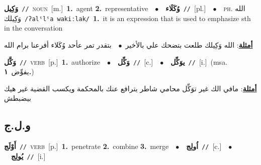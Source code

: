 \documentclass[10pt,a4paper,twoside]{article} %
\begin{document}
\begin{multicols}{2}
{\setlength\topsep{0pt}\textbf{\foreignlanguage{arabic}{وَكِيل}}\ {\color{gray}\texttt{//}\color{black}}\ \textsc{noun}\ [m.]\ \textbf{1.}~agent  \textbf{2.}~representative\ \ $\bullet$\ \ \setlength\topsep{0pt}\textbf{\foreignlanguage{arabic}{وُكَلَاء}}\ {\color{gray}\texttt{//}\color{black}}\ [pl.]\ \ $\bullet$\ \ \textsc{ph.} \color{gray} \foreignlanguage{arabic}{الله وَكِيلك}\color{black}\ {\color{gray}\texttt{/{\sffamily ʔalˤlˤa wakiːlak}/}\color{black}}\ \textbf{1.}~it is an expression that is used to emphasize sth in the conversation\  \begin{flushright}\color{gray}\foreignlanguage{arabic}{\textbf{\underline{\foreignlanguage{arabic}{أمثلة}}}: الله وَكِيلك طلعت بتضحك علي بالأخير\ $\bullet$\ \  بتقدر تمر عأحد وُكَلاء أفرعنا برام الله}\end{flushright}\color{black}} \vspace{2mm}

{\setlength\topsep{0pt}\textbf{\foreignlanguage{arabic}{وَكَّل}}\ {\color{gray}\texttt{//}\color{black}}\ \textsc{verb}\ [p.]\ \textbf{1.}~authorize\ \ $\bullet$\ \ \setlength\topsep{0pt}\textbf{\foreignlanguage{arabic}{وَكِّل}}\ {\color{gray}\texttt{//}\color{black}}\ [c.]\ \ $\bullet$\ \ \setlength\topsep{0pt}\textbf{\foreignlanguage{arabic}{يوَكِّل}}\ {\color{gray}\texttt{//}\color{black}}\ [i.]\ \color{gray}(msa. \foreignlanguage{arabic}{يفوِّض}~\foreignlanguage{arabic}{\textbf{١.}})\color{black}\  \begin{flushright}\color{gray}\foreignlanguage{arabic}{\textbf{\underline{\foreignlanguage{arabic}{أمثلة}}}: مافي الك غير توَكِّل محامي شاطر يترافع عنك بالمحكمة ويكسب القضية غير هيك بيضبطش}\end{flushright}\color{black}} \vspace{2mm}

\vspace{-3mm}
\subsection*{\color{blue}\foreignlanguage{arabic}{و.ل.ج}\color{blue}{}} 

{\setlength\topsep{0pt}\textbf{\foreignlanguage{arabic}{أَوْلَج}}\ {\color{gray}\texttt{//}\color{black}}\ \textsc{verb}\ [p.]\ \textbf{1.}~penetrate  \textbf{2.}~combine  \textbf{3.}~merge\ \ $\bullet$\ \ \setlength\topsep{0pt}\textbf{\foreignlanguage{arabic}{اُولِج}}\ {\color{gray}\texttt{//}\color{black}}\ [c.]\ \ $\bullet$\ \ \setlength\topsep{0pt}\textbf{\foreignlanguage{arabic}{يُولِج}}\ {\color{gray}\texttt{//}\color{black}}\ [i.]\ } \vspace{2mm}


\end{multicols}
\end{document}
